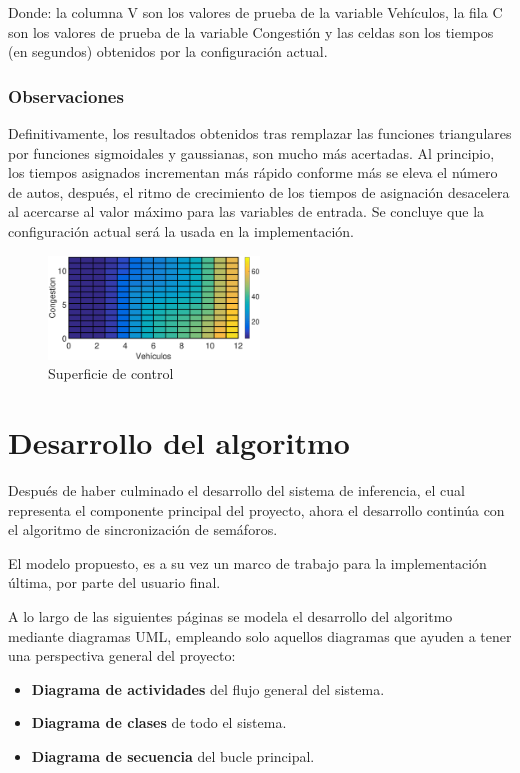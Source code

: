 Donde: la columna V son los valores de prueba de la variable Vehículos, la fila C son los valores de  prueba de la variable Congestión y las celdas son los tiempos (en segundos) obtenidos por la configuración actual.

\subsubsection{Observaciones}

\begin{multicols}{2}
	Definitivamente, los resultados obtenidos tras remplazar las funciones triangulares por funciones sigmoidales y gaussianas, son mucho más acertadas. Al principio, los tiempos asignados incrementan más rápido conforme más se eleva el número de autos, después, el ritmo de crecimiento de los tiempos de asignación desacelera al acercarse al valor máximo para las variables de entrada. Se concluye que la configuración actual será la usada en la implementación.
	\begin{figure}[H]
	\includegraphics[width=0.5\textwidth]{Surfaces/Surface2D_D.eps}
	\caption{Superficie de control}
\end{figure}
\end{multicols}
\pagebreak

\section{Desarrollo del algoritmo}\label{section:desarrolloAlgoritmo}
Después de haber culminado el desarrollo del sistema de inferencia, el cual representa el componente principal del proyecto, ahora el desarrollo continúa con el algoritmo de sincronización de semáforos.

El modelo propuesto, es a su vez un marco de trabajo para la implementación última, por parte del usuario final.

A lo largo de las siguientes páginas se modela el desarrollo del algoritmo mediante diagramas UML, empleando solo aquellos diagramas que ayuden a tener una perspectiva general del proyecto:
\begin{itemize}
	\item \textbf{Diagrama de actividades} del flujo general del sistema.
	\item \textbf{Diagrama de clases} de todo el sistema.
	\item \textbf{Diagrama de secuencia} del bucle principal.
\end{itemize}

